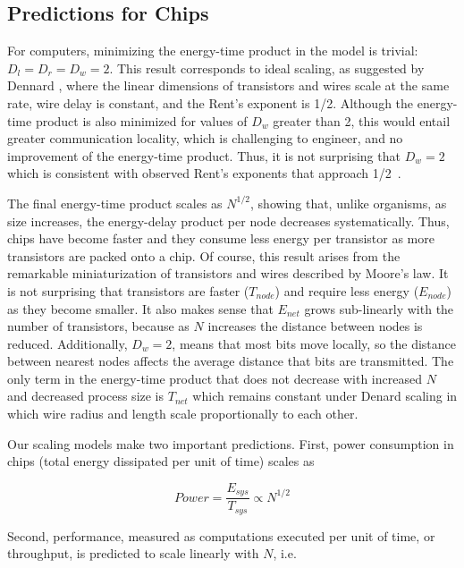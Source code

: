 \documentclass[12pt]{article}
\begin{document}
\subsection{Predictions for Chips}
\label{sec:comp-predictions}


For computers, minimizing the energy-time product in the model is trivial: $D_l=D_r=D_w =
2$. This result corresponds to ideal scaling, as suggested by Dennard
\cite{dennard74}, where the linear dimensions of transistors and wires scale at
the same rate, wire delay is constant, and the Rent's exponent is 1/2.  Although
the energy-time product is also minimized for values of $D_w$ greater than 2,
this would entail greater communication locality, which is challenging
to engineer, and no
improvement of the energy-time product.  Thus, it is not surprising
that $D_w = 2$ which is consistent with observed
Rent's exponents that approach 1/2~\cite{yang2001wirelength, solee2013evolutionary}. 


The final energy-time product scales as $N^{1/2}$, showing that, unlike
organisms, as size increases, the energy-delay product per node decreases
systematically.  Thus, chips have become faster and they consume less energy per
transistor as more transistors are packed onto a chip. Of course, this
result arises 
from the remarkable miniaturization of transistors and wires described by
Moore's law. It is not surprising that transistors are faster ($T_{node}$) and
require less energy ($E_{node}$) as they become smaller. It also makes sense
that  $E_{net}$ grows sub-linearly with the number of transistors, because as
$N$ increases the distance between nodes is reduced. Additionally, $D_w = 2$,
means that most bits move locally, so the distance between nearest nodes
affects the average distance that bits are transmitted.  The only term in the
energy-time product that does not decrease with increased $N$ and decreased
process size is $T_{net}$ which remains constant under Denard scaling in which
wire radius and length scale proportionally to each other.

Our scaling models make two important predictions.  First, power
consumption in chips (total energy dissipated per unit of time) scales as

\begin{equation}
\label{eq:Power}
Power = \frac{E_{sys}}{T_{sys}} \propto N^{1/2} 
\end{equation}
 
\noindent Second, performance,
measured as computations executed per unit of time, or throughput, is predicted
to scale linearly with $N$,  i.e.  
\end{document}
